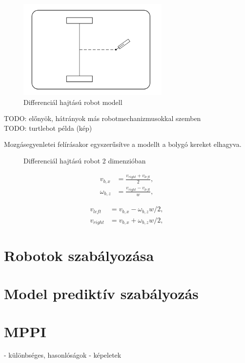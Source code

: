 \begin{figure}[!ht]
    \centering
    \includegraphics[width=75mm, keepaspectratio]{figures/025_diff_model.png}
    \caption{Differenciál hajtású robot modell \cite{siciliano2010robotics}}
    \label{fig:025_diff_model}
\end{figure}

TODO: előnyök, hátrányok más robotmechanizmusokkal szemben \\
TODO: turtlebot példa (kép)

Mozgásegyenletei felírásakor egyszerűsítve a modellt a bolygó kereket elhagyva.

\begin{figure}[!ht]
    \centering
    
    \caption{Differenciál hajtású robot 2 dimenzióban \cite{ros2_control_docs}}
    \label{fig:022_diff_drive}
\end{figure}

\begin{align}
    v_{b,x}      & = \frac{v_{right} + v_{left}}{2}, \\
    \omega_{b,z} & = \frac{v_{right} - v_{left}}{w},
\end{align}

\begin{align}
    v_{left}  & = v_{b,x} - \omega_{b,z} w / 2, \\
    v_{right} & = v_{b,x} + \omega_{b,z} w / 2,
\end{align}

\section{Robotok szabályozása}
\section{Model prediktív szabályozás}
\section{MPPI}
- különbséges, hasonlóságok
- képeletek
\section{}